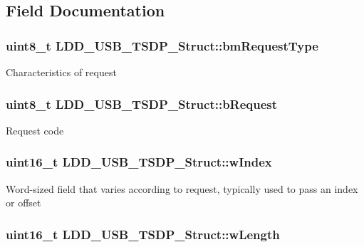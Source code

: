 \subsection{Field Documentation}
\hypertarget{struct_l_d_d___u_s_b___t_s_d_p___struct_afddb7f5f46fc265c07889888d1307a79}{
\subsubsection[{bm\-Request\-Type}]{\setlength{\rightskip}{0pt plus 5cm}uint8\-\_\-t L\-D\-D\-\_\-\-U\-S\-B\-\_\-\-T\-S\-D\-P\-\_\-\-Struct\-::bm\-Request\-Type}}\label{struct_l_d_d___u_s_b___t_s_d_p___struct_afddb7f5f46fc265c07889888d1307a79}
Characteristics of request \hypertarget{struct_l_d_d___u_s_b___t_s_d_p___struct_a38ea083d899a28927d0de58dd646054f}{
\subsubsection[{b\-Request}]{\setlength{\rightskip}{0pt plus 5cm}uint8\-\_\-t L\-D\-D\-\_\-\-U\-S\-B\-\_\-\-T\-S\-D\-P\-\_\-\-Struct\-::b\-Request}}\label{struct_l_d_d___u_s_b___t_s_d_p___struct_a38ea083d899a28927d0de58dd646054f}
Request code \hypertarget{struct_l_d_d___u_s_b___t_s_d_p___struct_af04dcae50f0c8d6b27bd1e70f1af89d6}{
\subsubsection[{w\-Index}]{\setlength{\rightskip}{0pt plus 5cm}uint16\-\_\-t L\-D\-D\-\_\-\-U\-S\-B\-\_\-\-T\-S\-D\-P\-\_\-\-Struct\-::w\-Index}}\label{struct_l_d_d___u_s_b___t_s_d_p___struct_af04dcae50f0c8d6b27bd1e70f1af89d6}
Word-\/sized field that varies according to request, typically used to pass an index or offset \hypertarget{struct_l_d_d___u_s_b___t_s_d_p___struct_a9015bd09ca306fdb49943219fafe3fe3}{
\subsubsection[{w\-Length}]{\setlength{\rightskip}{0pt plus 5cm}uint16\-\_\-t L\-D\-D\-\_\-\-U\-S\-B\-\_\-\-T\-S\-D\-P\-\_\-\-Struct\-::w\-Length}}\label{struct_l_d_d___u_s_b___t_s_d_p___struct_a9015bd09ca306fdb49943219fafe3fe3}

